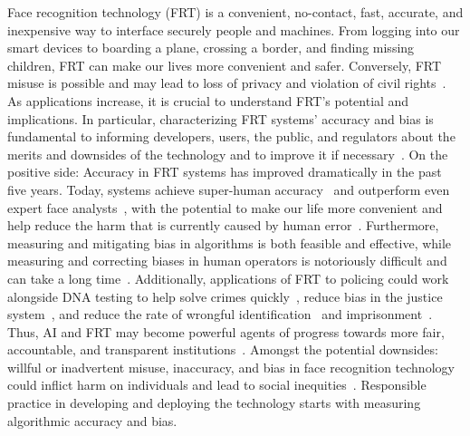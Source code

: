 \documentclass[10pt,twocolumn,letterpaper]{article}
\begin{document}
Face recognition technology (FRT) is a convenient, no-contact, fast, accurate, and inexpensive way to interface securely people and machines.  From logging into our smart devices to boarding a plane, crossing a border, and finding missing children, FRT can make our lives more convenient and safer. Conversely, FRT misuse is possible and may lead to loss of privacy and violation of civil rights~\cite{van2020ethical,castelvecchi2020facial}. As applications increase, it is crucial to understand FRT's potential and implications. In particular, characterizing FRT systems' accuracy and bias is fundamental to informing developers, users, the public, and regulators about the merits and downsides of the technology and to improve it if necessary~\cite{chiroro1995investigation,hills2013eye,johnson2005we,kearns2019ethical,castelvecchi2020facial}. On the positive side: 
Accuracy in FRT systems has improved dramatically in the past five years. Today, systems achieve super-human accuracy~\cite{deng2019arcface,liu2017sphereface,schroff2015facenet,zhao2003face} and outperform even expert face analysts~\cite{phillips2018face}, with the potential to make our life more convenient and help reduce the harm that is currently caused by human error~\cite{thompson2000,albright2017eyewitnesses}. Furthermore, measuring and mitigating bias in algorithms is both feasible and effective, while measuring and correcting biases in human operators is notoriously difficult and can take a long time~\cite{chang2019mixed,mullainathan2019biased}. Additionally, applications of FRT to policing could work alongside DNA testing to help solve crimes quickly~\cite{harrisSpectrum21}, reduce bias in the justice system~\cite{meissner2001thirty}, and reduce the rate of wrongful identification~\cite{albright2017eyewitnesses,albright2021us} and imprisonment~\cite{thompson2000}. Thus, AI and FRT may become powerful agents of progress towards more fair, accountable, and transparent institutions~\cite{kleinberg2018discrimination,mullainathan2019biased}. Amongst the potential downsides: willful or inadvertent misuse, inaccuracy, and bias in face recognition technology could inflict harm on individuals and lead to social inequities~\cite{kearns2019ethical,van2020ethical,castelvecchi2020facial}. Responsible practice in developing and deploying the technology starts with measuring algorithmic accuracy and bias.
\end{document}
